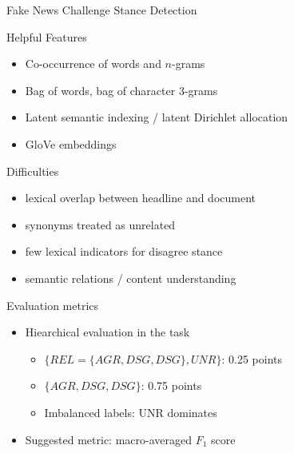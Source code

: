 \documentclass[english,handout]{mlutalk}
\begin{document}
\begin{frame}[allowframebreaks]{Fake News Challenge Stance Detection~\cite{HanselowskiSSCC2018}}
  \begin{block}{Helpful Features}
    \begin{itemize}
      \item Co-occurrence of words and \(n\)-grams
      \item Bag of words, bag of character 3-grams
      \item Latent semantic indexing / latent Dirichlet allocation
      \item GloVe embeddings
    \end{itemize}
  \end{block}
    
  \framebreak

  \begin{block}{Difficulties}
    \begin{itemize}
      \item lexical overlap between headline and document
      \item synonyms treated as unrelated
      \item few lexical indicators for disagree stance
      \item semantic relations / content understanding
    \end{itemize}
  \end{block}
  
  \begin{block}{Evaluation metrics}
    \begin{itemize}
      \item Hiearchical evaluation in the task
      \begin{itemize}
        \item $\{ REL=\{AGR, DSG, DSG\}, UNR\}$: 0.25 points
        \item $\{AGR, DSG, DSG\}$: 0.75 points
        \item Imbalanced labels: UNR dominates
      \end{itemize}
      \item Suggested metric: macro-averaged $F_1$ score 
    \end{itemize}
  \end{block}
\end{frame}
\end{document}
